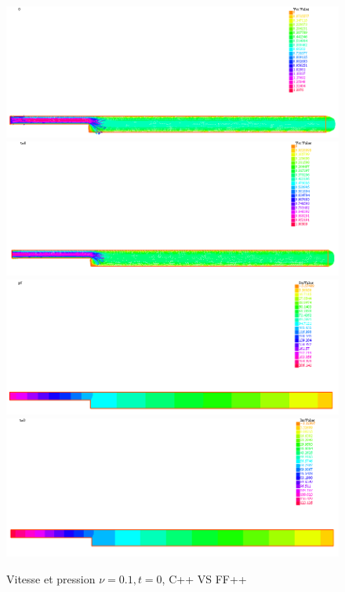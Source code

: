 \documentclass[a4paper,12pt]{article}
\begin{document}
\begin{figure}[!h]
	\caption{Vitesse et pression $\nu = 0.1,t=0$, C++ VS FF++}
	\centering
	\includegraphics[width=0.49\linewidth]{image/c++_NS_nu=01_t=0_u.png}
	\includegraphics[width=0.49\linewidth]{image/ff++_NS_nu=01_t=0_u.png}
	\includegraphics[width=0.49\linewidth]{image/c++_NS_nu=01_t=0_p.png}
	\includegraphics[width=0.49\linewidth]{image/ff++_NS_nu=01_t=0_p.png}
\end{figure}
\end{document}
